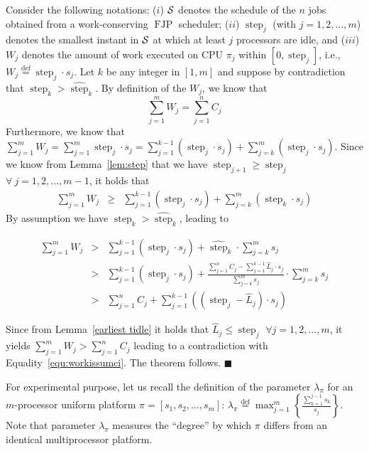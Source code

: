 \documentclass[10pt,english,a4paper]{article}
\newcommand{\equals}{\stackrel{\mathrm{def}}{=}}
\newenvironment{proof}[1][Proof]{\begin{trivlist}
\item[\hskip \labelsep {\bfseries #1}]}{\end{trivlist}}
\newtheorem{validity test}{Validity Test}
\newcommand{\FJP}{\operatorname{FJP}}
\newcommand{\step}{\widehat{\operatorname{step}}}
\newcommand{\minstep}{\operatorname{step}}
\newcommand{\fin}{\hfill{\small $\blacksquare$}}     \newcommand{\oh}[1]{\ensuremath{\mathcal{0}{(#1)}}} \def\thefootnote{\arabic{footnote}}
\begin{document}
\begin{proof}
Consider the following notations: ($i$) ${\cal S}$ denotes the schedule of the $n$ jobs obtained from a work-conserving $\FJP$ scheduler; ($ii$) $\minstep_j$ (with $j = 1, 2, \ldots, m$) denotes the smallest instant in ${\cal S}$ at which at least $j$ processors are idle, and ($iii$) $W_j$ denotes the amount of work executed on CPU $\pi_j$ within $[ 0, \minstep_j ]$, i.e., $W_j \equals \minstep_j \cdot s_j$. Let $k$ be any integer in $\left[ 1, m \right]$ and suppose by contradiction that $\minstep_k > \step_k$. By definition of the $W_j$, we know that 
\begin{equation}\label{equ:workissumci}
\sum_{j = 1}^m W_j = \sum_{j = 1}^n C_j
\end{equation}
Furthermore, we know that $\sum_{j = 1}^m W_j = \sum_{j = 1}^m \minstep_j \cdot s_j = \sum_{j = 1}^{k-1} (\minstep_j \cdot s_j) + \sum_{j = k}^{m} (\minstep_j \cdot s_j)$. Since we know from Lemma~\ref{lem:step} that we have $\minstep_{j+1} \geq \minstep_j$ $\forall~j=1, 2, \ldots, m-1$, it holds that
\begin{eqnarray}
\sum_{j = 1}^m W_j & \geq & \sum_{j = 1}^{k-1} (\minstep_j \cdot s_j) + \sum_{j = k}^{m} (\minstep_k \cdot s_j) \nonumber \end{eqnarray}
By assumption we have $\minstep_k > \step_k$, leading to
\begin{small}
\begin{eqnarray}
\sum_{j = 1}^m W_j & > & \sum_{j = 1}^{k-1} (\minstep_j \cdot s_j) + \step_k \cdot \sum_{j = k}^{m} s_j \nonumber \\
& > & \sum_{j = 1}^{k-1} (\minstep_j \cdot s_j) + \frac{\sum_{j=1}^{n} C_j - \sum_{j=1}^{k-1} \hat{L}_j \cdot s_j}{\sum_{j=k}^m s_j} \cdot \sum_{j = k}^{m} s_j \nonumber \\
& > & \sum_{j=1}^{n} C_j + \sum_{j = 1}^{k-1} \left((\minstep_j - \hat{L}_j ) \cdot s_j \right) \nonumber
\end{eqnarray}
\end{small}
Since from Lemma~\ref{earliest tidle} it holds that $\hat{L}_j \leq \minstep_j$ $\forall j=1, 2, \ldots, m$, it yields $\sum_{j = 1}^m W_j > \sum_{j=1}^{n} C_j$ leading to a contradiction with Equality~\ref{equ:workissumci}. The theorem follows. \fin
\end{proof}



For experimental purpose, let us recall the definition of the parameter $\lambda_\pi$ \cite{SGB2001} for an $m$-processor uniform platform $\pi = [s_1, s_2, \ldots, s_m]$: $\lambda_\pi \equals \max_{j=1}^{m} \left\{\frac{\sum_{k=1}^{j-1} s_k}{s_j} \right\}$. Note that parameter $\lambda_\pi$ measures the ``degree'' by which $\pi$ differs from an identical multiprocessor platform. 
\end{document}
